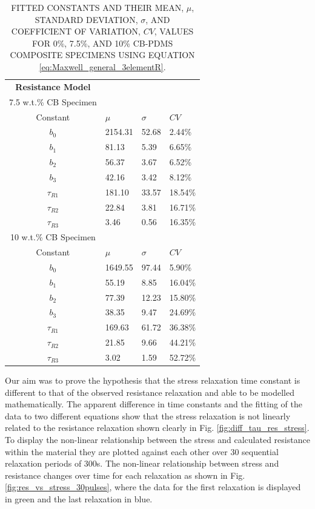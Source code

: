 \begin{table}[H]
\caption{FITTED CONSTANTS AND THEIR MEAN, $\mu$, STANDARD DEVIATION, $\sigma$, AND COEFFICIENT OF VARIATION, $CV$, VALUES FOR 0\%, 7.5\%, AND 10\% CB-PDMS COMPOSITE SPECIMENS USING EQUATION \ref{eq:Maxwell_general_3elementR}.}
\begin{center}
\label{tab:generalised_model_constants}
\begin{tabular}{c l l l}
\textbf{Resistance Model} \\
7.5 w.t.\% CB Specimen \\
\hline
Constant & $\mu$ & $\sigma$ & $CV$ \\
\hline
$b_0$ & 2154.31 & 52.68 & 2.44\% \\
$b_1$ & 81.13 & 5.39 & 6.65\% \\
$b_2$ & 56.37 & 3.67 & 6.52\% \\
$b_3$ & 42.16 & 3.42 & 8.12\% \\
$\tau_{R1}$ & 181.10 & 33.57 & 18.54\% \\
$\tau_{R2}$ & 22.84 & 3.81 & 16.71\% \\
$\tau_{R3}$ & 3.46 & 0.56 & 16.35\% \\
\hline
10 w.t.\% CB Specimen \\
Constant & $\mu$ & $\sigma$ & $CV$ \\
\hline
$b_0$ & 1649.55 & 97.44 & 5.90\% \\
$b_1$ & 55.19 & 8.85 & 16.04\% \\
$b_2$ & 77.39 & 12.23 & 15.80\% \\
$b_3$ & 38.35 & 9.47 & 24.69\% \\
$\tau_{R1}$ & 169.63 & 61.72 & 36.38\% \\
$\tau_{R2}$ & 21.85 & 9.66 & 44.21\% \\
$\tau_{R3}$ & 3.02 & 1.59 & 52.72\% \\
\hline
\end{tabular}
\end{center}
\end{table}
Our aim was to prove the hypothesis that the stress relaxation time constant is different to that of the observed resistance relaxation and able to be modelled mathematically. The apparent difference in time constants and the fitting of the data to two different equations show that the stress relaxation is not linearly related to the resistance relaxation shown clearly in Fig. \ref{fig:diff_tau_res_stress}. To display the non-linear relationship between the stress and calculated resistance within the material they are plotted against each other over 30 sequential relaxation periods of 300s. The non-linear relationship between stress and resistance changes over time for each relaxation as shown in Fig. \ref{fig:res_vs_stress_30pulses}, where the data for the first relaxation is displayed in green and the last relaxation in blue.
